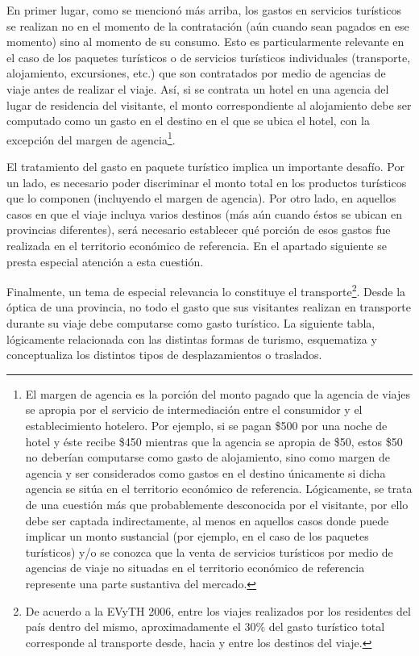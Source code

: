 \documentclass[
]{book}
\begin{document}
En primer lugar, como se mencionó más arriba, los gastos en servicios turísticos se realizan no en el momento de la contratación (aún cuando sean pagados en ese momento) sino al momento de su consumo. Esto es particularmente relevante en el caso de los paquetes turísticos o de servicios turísticos individuales (transporte, alojamiento, excursiones, etc.) que son contratados por medio de agencias de viaje antes de realizar el viaje. Así, si se contrata un hotel en una agencia del lugar de residencia del visitante, el monto correspondiente al alojamiento debe ser computado como un gasto en el destino en el que se ubica el hotel, con la excepción del margen de agencia\footnote{El margen de agencia es la porción del monto pagado que la agencia de viajes se apropia por el servicio de intermediación entre el consumidor y el establecimiento hotelero. Por ejemplo, si se pagan \$500 por una noche de hotel y éste recibe \$450 mientras que la agencia se apropia de \$50, estos \$50 no deberían computarse como gasto de alojamiento, sino como margen de agencia y ser considerados como gastos en el destino únicamente si dicha agencia se sitúa en el territorio económico de referencia. Lógicamente, se trata de una cuestión más que probablemente desconocida por el visitante, por ello debe ser captada indirectamente, al menos en aquellos casos donde puede implicar un monto sustancial (por ejemplo, en el caso de los paquetes turísticos) y/o se conozca que la venta de servicios turísticos por medio de agencias de viaje no situadas en el territorio económico de referencia represente una parte sustantiva del mercado.}.

El tratamiento del gasto en paquete turístico implica un importante desafío. Por un lado, es necesario poder discriminar el monto total en los productos turísticos que lo componen (incluyendo el margen de agencia). Por otro lado, en aquellos casos en que el viaje incluya varios destinos (más aún cuando éstos se ubican en provincias diferentes), será necesario establecer qué porción de esos gastos fue realizada en el territorio económico de referencia. En el apartado siguiente se presta especial atención a esta cuestión.

Finalmente, un tema de especial relevancia lo constituye el transporte\footnote{De acuerdo a la EVyTH 2006, entre los viajes realizados por los residentes del país dentro del mismo, aproximadamente el \(30\%\) del gasto turístico total corresponde al transporte desde, hacia y entre los destinos del viaje.}. Desde la óptica de una provincia, no todo el gasto que sus visitantes realizan en transporte durante su viaje debe computarse como gasto turístico. La siguiente tabla, lógicamente relacionada con las distintas formas de turismo, esquematiza y conceptualiza los distintos tipos de desplazamientos o traslados.
\end{document}
